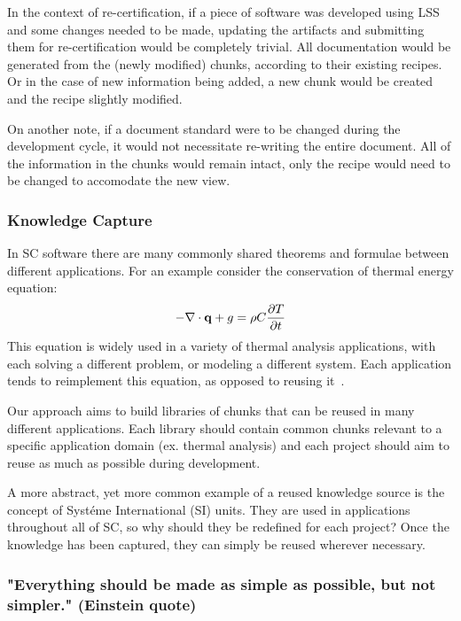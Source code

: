 \documentclass{sig-alternate-05-2015}
\newcommand{\lss}{LSS}
\begin{document}
In the context of re-certification, if a piece of software was developed using
\lss{} and some changes needed to be made, updating the artifacts and submitting
them for re-certification would be completely trivial. All documentation would
be generated from the (newly modified) chunks, according to their existing
recipes. Or in the case of new information being added, a new chunk would be
created and the recipe slightly modified.

On another note, if a document standard were to be changed during the
development cycle, it would not necessitate re-writing the entire document. All
of the information in the chunks would remain intact, only the recipe would need
to be changed to accomodate the new view.

\subsubsection{Knowledge Capture} \label{sssec:adv_knowledge}

In SC software there are many commonly shared theorems and formulae between
different applications. For an example consider the conservation of thermal
energy equation:
\begin{displaymath} -{\bf \nabla \cdot q} + g = \rho C
\frac{\partial T}{\partial t} \end{displaymath}
This equation is widely used in a variety of thermal analysis applications, with
each solving a different problem, or modeling a different system. Each
application tends to reimplement this equation, as opposed to reusing
it~\cite{TODO}. %

Our approach aims to build libraries of chunks that can be reused in many
different applications. Each library should contain common chunks relevant to a
specific application domain (ex. thermal analysis) and each project should aim
to reuse as much as possible during development.

A more abstract, yet more common example of a reused knowledge source is the
concept of Syst\'{e}me International (SI) units. They are used in applications
throughout all of SC, so why should they be redefined for each project? Once the
knowledge has been captured, they can simply be reused wherever necessary.

\subsubsection{"Everything should be made as simple as possible, but not
  simpler."  (Einstein quote)} \label{sssec:adv_simple}
\end{document}
